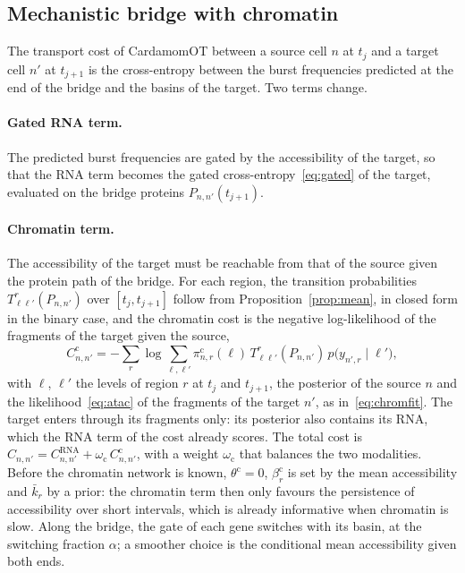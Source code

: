 \documentclass[a4paper, 11pt]{article}
\newcommand{\thc}{\theta^{\mathrm{c}}}
\newcommand{\bc}{\beta^{\mathrm{c}}}
\theoremstyle{plain}
\theoremstyle{remark}
\begin{document}
\subsection{Mechanistic bridge with chromatin}\label{sec:bridge}

The transport cost of CardamomOT between a source cell $n$ at $t_j$ and a target cell $n'$ at $t_{j+1}$ is the cross-entropy between the burst frequencies predicted at the end of the bridge and the basins of the target. Two terms change.

\paragraph{Gated RNA term.} The predicted burst frequencies are gated by the accessibility of the target, so that the RNA term becomes the gated cross-entropy~\eqref{eq:gated} of the target, evaluated on the bridge proteins $P_{n,n'}(t_{j+1})$.

\paragraph{Chromatin term.} The accessibility of the target must be reachable from that of the source given the protein path of the bridge. For each region, the transition probabilities $T^r_{\ell\ell'}(P_{n,n'})$ over $[t_j, t_{j+1}]$ follow from Proposition~\ref{prop:mean}, in closed form in the binary case, and the chromatin cost is the negative log-likelihood of the fragments of the target given the source,
\begin{equation}\label{eq:chromcost}
C^{\mathrm{c}}_{n,n'} = -\sum_{r} \log \sum_{\ell,\ell'} \pi^{\mathrm{c}}_{n,r}(\ell)\,T^r_{\ell\ell'}(P_{n,n'})\,p\bigl(y_{n',r} \mid \ell'\bigr) ,
\end{equation}
with $\ell$, $\ell'$ the levels of region $r$ at $t_j$ and $t_{j+1}$, the posterior of the source $n$ and the likelihood~\eqref{eq:atac} of the fragments of the target $n'$, as in~\eqref{eq:chromfit}. The target enters through its fragments only: its posterior also contains its RNA, which the RNA term of the cost already scores. The total cost is $C_{n,n'} = C^{\mathrm{RNA}}_{n,n'} + \omega_{\mathrm c}\,C^{\mathrm{c}}_{n,n'}$, with a weight $\omega_{\mathrm c}$ that balances the two modalities. Before the chromatin network is known, $\thc = 0$, $\bc_r$ is set by the mean accessibility and $\bar k_r$ by a prior: the chromatin term then only favours the persistence of accessibility over short intervals, which is already informative when chromatin is slow. Along the bridge, the gate of each gene switches with its basin, at the switching fraction $\alpha$; a smoother choice is the conditional mean accessibility given both ends.
\end{document}

